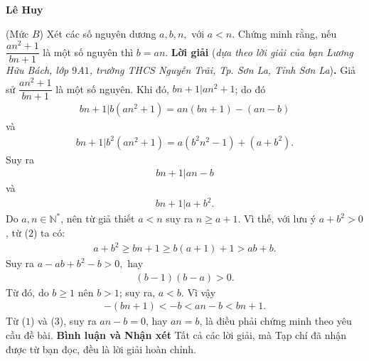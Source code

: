 \begin{multicols}{2}
	\begin{flushright}
		\textbf{\color{thachthuctoanhoc}Lê Huy}
	\end{flushright}
	{\color{thachthuctoanhoc}{\usefont{T5}{qag}{b}{n} P702.}}
	(Mức $B$) Xét các số nguyên dương $a,b,n,$  với $a<n.$ Chứng minh rằng, nếu  $\dfrac{an^2+1}{bn+1}$ là một số nguyên thì $b=an$. 
	\vskip 0.05cm
	\textbf{\color{thachthuctoanhoc}Lời giải} (\textit{dựa theo lời giải của bạn Lương Hữu Bách, lớp $9$A$1$, trường THCS Nguyễn Trãi, Tp. Sơn La, Tỉnh Sơn La})\textbf{\color{thachthuctoanhoc}.}
	\vskip 0.05cm
	Giả sử $\dfrac{{a{n^2} + 1}}{{bn + 1}}$ là một số nguyên.
	\vskip 0.05cm
	Khi đó, $\left. {bn + 1} \right|a{n^2} + 1$;  do đó
	\begin{align*}
		\left. {bn \!+\! 1} \right|b\left( {a{n^2} \!+\! 1} \right) \!=\! an\left( {bn \!+\! 1} \right) \!-\! \left( {an \!-\! b} \right)
	\end{align*}
	và     
	\begin{align*}
		\left. {bn \!+\! 1} \right|{b^2}\left(\!{a{n^2} \!+\! 1} \!\right) \!=\! a\left( \!{{b^2}{n^2} \!-\! 1}\! \right) \!+\! \left(\!{a \!+\! {b^2}} \right).
	\end{align*}                                     
	Suy ra
	\begin{align*}
		\left. {bn + 1} \right|an - b \tag{$1$}
	\end{align*}
	và 
	\begin{align*}
		\left. {bn + 1} \right|a + {b^2}. \tag{$2$}
	\end{align*}
	Do $a, n \in \mathbb{N^*}$, nên từ giả thiết $a < n$ suy ra $n \ge  a + 1$. Vì thế, với lưu ý $a + b^2 > 0$,  từ ($2$) ta có:
	\begin{align*}
		a + {b^2} \ge bn + 1 \ge b\left( {a + 1} \right) + 1 > ab + b.
	\end{align*}
	Suy ra $a - ab + {b^2} - b > 0,$  hay
	\begin{align*}
		\left( {b - 1} \right)\left( {b - a} \right) > 0.
	\end{align*}
	Từ đó, do $b \ge 1$ nên $b > 1$; suy ra, $a < b$. Vì vậy
	\begin{align*}
		- \left( {bn + 1} \right) <  - b < an - b < bn + 1. \tag{$3$}
	\end{align*}
	Từ ($1$) và ($3$), suy ra $an - b = 0$, hay $an = b$, là điều phải chứng minh theo yêu cầu đề bài.
	\vskip 0.05cm
	\textbf{\color{thachthuctoanhoc}Bình luận và Nhận xét}
	\vskip 0.05cm
	Tất cả các lời giải, mà Tạp chí đã nhận được từ bạn đọc, đều là lời giải hoàn chỉnh.
	\begin{flushright}

\end{flushright}
\end{multicols}
